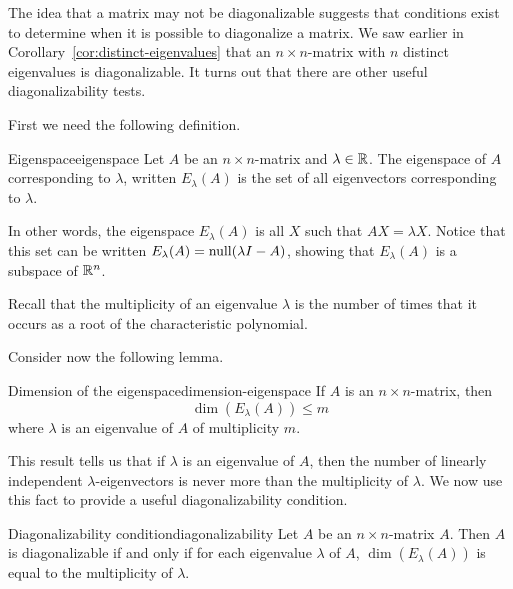 The idea that a matrix may not be diagonalizable suggests that conditions exist to determine when it is possible to diagonalize a matrix. We saw earlier in Corollary~\ref{cor:distinct-eigenvalues} that an $n \times n$-matrix with $n$ distinct eigenvalues is diagonalizable. It turns out that there are other useful diagonalizability tests. 

First we need the following definition.

\begin{definition}{Eigenspace}{eigenspace}
Let $A$ be an $n\times n$-matrix and $\lambda\in\mathbb{R}$.
The eigenspace of $A$ corresponding to $\lambda$, written $E_{\lambda}(A)$
is the set of all eigenvectors corresponding to $\lambda$. 
\end{definition}

In other words, the eigenspace $E_{\lambda}(A)$ is all $X$ such that $AX = \lambda X$. Notice that this set can be written $E_{\lambda}(A) = \nullspace(\lambda I - A)$, showing that $E_{\lambda}(A)$ is a subspace of $\mathbb{R}^n$. 

Recall that the multiplicity of an eigenvalue $\lambda$ is the number of times that it occurs as a root of the characteristic polynomial.

Consider now the following lemma.

\begin{lemma}{Dimension of the eigenspace}{dimension-eigenspace}
If $A$ is an $n\times n$-matrix,  then 
\[ \dim(E_{\lambda}(A))\leq m\]
where $\lambda$ is an
eigenvalue of $A$ of multiplicity $m$.
\end{lemma}

This result tells us that if $\lambda$ is an eigenvalue of $A$, then
the number of linearly independent $\lambda$-eigenvectors
is never more than the multiplicity of $\lambda$. We now use this fact to provide a useful diagonalizability condition.

\begin{theorem}{Diagonalizability condition}{diagonalizability}
Let $A$ be an $n \times n$-matrix $A$. Then $A$ is diagonalizable if and only if for each eigenvalue $\lambda$ of $A$, $\dim(E_{\lambda}(A))$ is equal to the multiplicity of $\lambda$.
\end{theorem}

